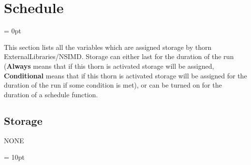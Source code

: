
\section{Schedule} 


\parskip = 0pt


\noindent This section lists all the variables which are assigned storage by thorn ExternalLibraries/NSIMD.  Storage can either last for the duration of the run ({\bf Always} means that if this thorn is activated storage will be assigned, {\bf Conditional} means that if this thorn is activated storage will be assigned for the duration of the run if some condition is met), or can be turned on for the duration of a schedule function.


\subsection*{Storage}NONE

\vspace{5mm}\parskip = 10pt 
